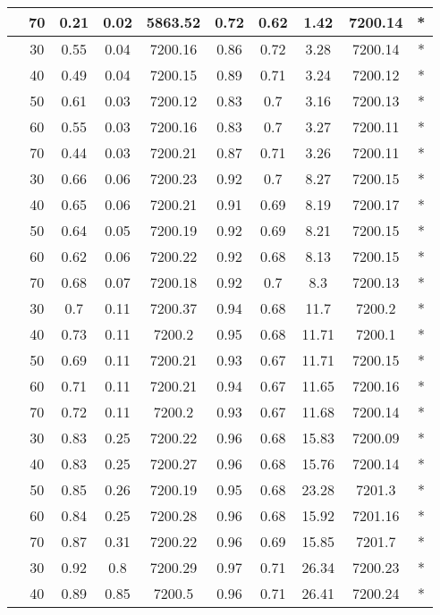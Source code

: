 \begin{table}[!h]
\begin{tabular}{|c|c|c c c c|c c c c|}
& 70 &	0.21 &	0.02 &	5863.52 &	0.72 &	0.62 &	1.42 &	7200.14 &	*\\
\hline
\multirow{5}{*}{\midrule 9} & 30 & 0.55 &	0.04 &	7200.16 &	0.86 &	0.72 &	3.28 &	7200.14	 & *\\
& 40 &	0.49 &	0.04 &	7200.15 &	0.89 &	0.71 &	3.24 &	7200.12	& *\\
& 50 &	0.61 &	0.03 &	7200.12	& 0.83	& 0.7 &	3.16 &	7200.13 &	*\\
& 60 &	0.55 &	0.03 &	7200.16 &	0.83 &	0.7 &	3.27 &	7200.11 &	*\\
& 70 & 0.44 &	0.03 &	7200.21 &	0.87 &	0.71 &	3.26 &	7200.11	& *\\
\hline
\multirow{5}{*}{\midrule 10} & 30 &	0.66 &	0.06 &	7200.23 &	0.92 &	0.7 &	8.27 &	7200.15 &	*\\
& 40 &	0.65 &	0.06 &	7200.21 &	0.91 &	0.69 &	8.19 &	7200.17 &	*\\
& 50 &	0.64 &	0.05 &	7200.19	 & 0.92 &	0.69 &	8.21 &	7200.15 &	*\\
& 60 &	0.62 &	0.06 &	7200.22 &	0.92 &	0.68 &	8.13 &	7200.15 &	*\\
& 70 &	0.68 &	0.07 &	7200.18 &	0.92 &	0.7 &	8.3 &	7200.13	& *\\
\hline
\multirow{5}{*}{\midrule 11} & 30 &	0.7	& 0.11 &	7200.37	& 0.94	& 0.68 &	11.7 &	7200.2 & *\\
& 40 &	0.73 &	0.11 &	7200.2	& 0.95 &	0.68 &	11.71 &	7200.1 &	*\\
& 50 &	0.69 &	0.11 &	7200.21 &	0.93 &	0.67 &	11.71 &	7200.15 &	*\\
& 60 &	0.71 &	0.11 &	7200.21	 & 0.94 &	0.67 &	11.65 &	7200.16 &	*\\
& 70 &	0.72 &	0.11 &	7200.2 &	0.93 &	0.67 &	11.68 &	7200.14	& *\\
\hline
\multirow{5}{*}{\midrule 12} & 30 &	0.83 &	0.25 &	7200.22 &	0.96 &	0.68 &	15.83 &	7200.09 &	*\\
& 40 &	0.83 &	0.25 &	7200.27 &	0.96 &	0.68 &	15.76 &	7200.14 &	*\\
& 50 &	0.85 &	0.26 &	7200.19	& 0.95	& 0.68 &	23.28 &	7201.3 &	*\\
& 60 &	0.84 &	0.25 &	7200.28 &	0.96 &	0.68 &	15.92 &	7201.16 &	*\\
& 70 &	0.87 &	0.31 &	7200.22 &	0.96 &	0.69 &	15.85 &	7201.7 &	*\\
\hline\multirow{5}{*}{\midrule 13} & 30 &	0.92 &	0.8	& 7200.29 &	0.97 &	0.71 &	26.34 &	7200.23	& *\\
& 40 &	0.89 &	0.85 &	7200.5	& 0.96 &	0.71 &	26.41 &	7200.24 &	*\\

\end{tabular}
\end{table}
